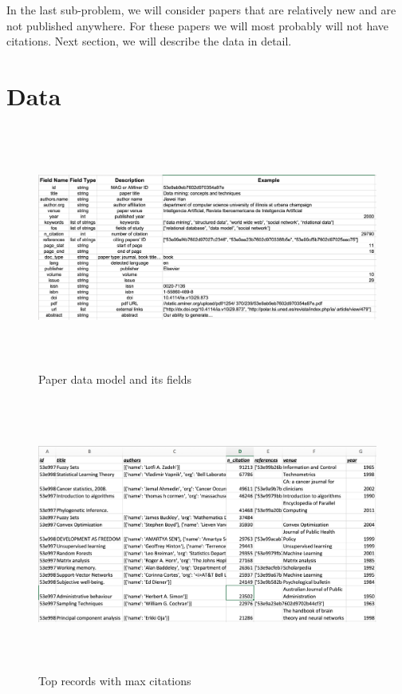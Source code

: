 \documentclass[a4paper, 11pt]{article}
\begin{document}
In the last sub-problem, we will consider papers that are relatively new and are not published anywhere. For these papers we will most probably will not have citations. Next section, we will describe the data in detail.

\section{Data}

\begin{figure}[h]
    \centering
    \includegraphics[width=17cm,height=8cm]{datamodel_new}
    \caption{Paper data model and its fields \cite{data}}
    \label{fig:datamodel}
\end{figure}

\begin{figure}[h]
    \centering
    \includegraphics[width=17cm,height=9cm]{top_papers}
    \caption{Top records with max citations}
    \label{fig:top_papers}
\end{figure}
\end{document}

